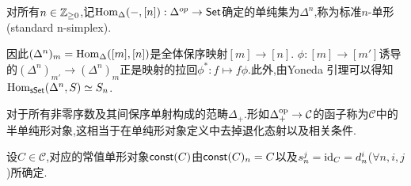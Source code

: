 \begin{definition}[标准$n$-单形]
    对所有$n \in \mathbb{Z}_{\geq 0}$,记$\operatorname{Hom}_{\Delta}(-,[n]): \Delta^{op}\to \mathsf{Set}$确定的单纯集为$\Delta^n$,称为标准$n$-单形(standard n-simplex).
\end{definition}
\begin{remark}
    因此$(\Delta^n)_m = \operatorname{Hom}_{\Delta}([m],[n])$是全体保序映射$[m]\to [n]$. $\phi: [m]\to [m']$诱导的$(\Delta^n)_{m'} \to (\Delta^n)_{m}$正是映射的拉回$\phi^* : f \mapsto f\phi$.此外,由Yoneda 引理可以得知$\operatorname{Hom}_{\mathsf{sSet}}(\Delta^n,S) \simeq S_n$.
\end{remark}
\begin{remark}
    对于所有非零序数及其间保序单射构成的范畴$\Delta_+$.形如$\Delta_+^{\operatorname{op}} \to \mathcal{C}$的函子称为$\mathcal{C}$中的半单纯形对象,这相当于在单纯形对象定义中去掉退化态射以及相关条件.
\end{remark}
\begin{example}
    设$C\in\mathcal{C}$,对应的常值单形对象$\mathsf{const}(C)$由$\mathsf{const}(C)_n = C$以及$s_n^j = \mathrm{id}_C = d_n^i$($\forall n,i,j$)所确定.
\end{example}
